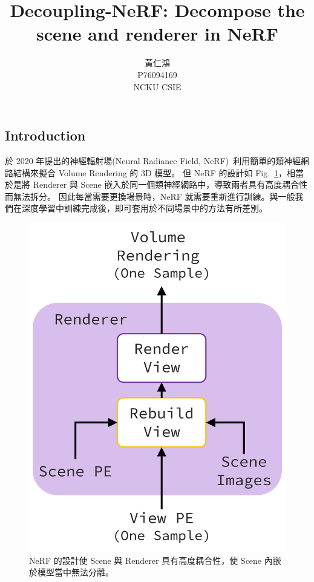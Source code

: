 \documentclass[10pt,twocolumn,letterpaper]{article}
\begin{document}
\begin{CJK}{UTF8}{bkai}
   \title{Decoupling-NeRF: Decompose the scene and renderer in NeRF}

   \author{
      黃仁鴻\\
      P76094169\\
      NCKU CSIE
   }

   \maketitle



   \section{Introduction}
   於 2020 年提出的神經輻射場(Neural Radiance Field,
   NeRF)~\cite{mildenhall2020nerf}利用簡單的類神經網路結構來擬合
   Volume Rendering 的 3D 模型。
   但 NeRF 的設計如 Fig.~\ref{fig:NeRF-is-content-coupling}，相當於是將
   Renderer 與 Scene 嵌入於同一個類神經網路中，導致兩者具有高度耦合性而無法拆分。
   因此每當需要更換場景時，NeRF 就需要重新進行訓練。與一般我們在深度學習中訓練完成後，即可套用於不同場景中的方法有所差別。

   \begin{figure}[b]
      \begin{center}
         \includegraphics[width=0.8\linewidth]{img/NeRF-is-content-coupling.png}
      \end{center}
      \caption{
         NeRF 的設計使 Scene 與 Renderer 具有高度耦合性，使 Scene 內嵌於模型當中無法分離。
      }
      \label{fig:NeRF-is-content-coupling}
   \end{figure}


\end{CJK}
\end{document}
